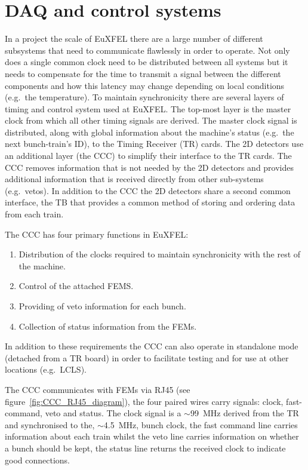 \section{DAQ and control systems} %
\label{sec:daq_and_control_systems}
In a project the scale of EuXFEL there are a large number of different subsystems that need to communicate flawlessly in order to operate. Not only does a single common clock need to be distributed between all systems but it needs to compensate for the time to transmit a signal between the different components and how this latency may change depending on local conditions (e.g.\ the temperature). To maintain synchronicity there are several layers of timing and control system used at EuXFEL. The top-most layer is the master clock from which all other timing signals are derived. The master clock signal is distributed,  along with global information about the machine's status (e.g.\ the next bunch-train's ID), to the Timing Receiver (TR) cards. The 2D detectors use an additional layer (the CCC) to simplify their interface to the TR cards. The CCC removes information that is not needed by the 2D detectors and provides additional information that is received directly from other sub-systems (e.g.\ vetos). In addition to the CCC the 2D detectors share a second common interface, the TB that provides a common method of storing and ordering data from each train.

The CCC has four primary functions in EuXFEL: 
\begin{enumerate}
  \item Distribution of the clocks required to maintain synchronicity with the rest of the machine.
  \item Control of the attached FEMS.
  \item Providing of veto information for each bunch.
  \item Collection of status information from the FEMs.
\end{enumerate}
In addition to these requirements the CCC can also operate in standalone mode (detached from a TR board) in order to facilitate testing and for use at other locations (e.g.\ LCLS). 

The CCC communicates with FEMs via RJ45 (see figure~\ref{fig:CCC_RJ45_diagram}), the four paired wires carry signals: clock, fast-command, veto and status. The clock signal is a \(\sim\)99~MHz derived from the TR and synchronised to the, \(\sim\)4.5~MHz, bunch clock, the fast command line carries information about each train whilst the veto line carries information on whether a bunch should be kept, the status line returns the received clock to indicate good connections.
